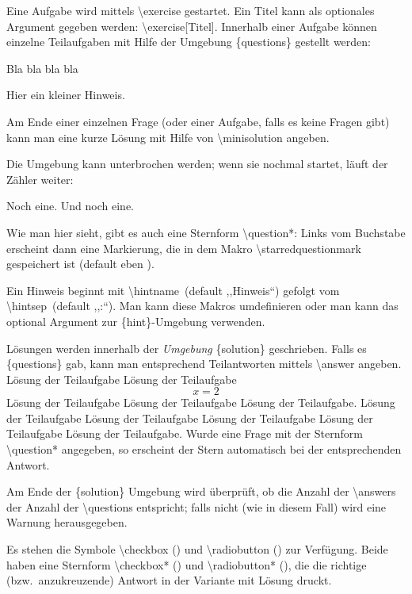 \documentclass[hyperworksheet]{drcschool}
\newcommand*{\cs}[1]{\textup{\ttfamily\textbackslash#1}}                   %
\newcommand*{\opt}[1]{\textup{\ttfamily#1}}                                %
\newcommand*{\env}[1]{\textup{\ttfamily\{#1\}}}                            %
\begin{document}
\begin{worksheet}
\exercise[Titel]\label{ex:foo}
Eine Aufgabe wird mittels \cs{exercise} gestartet.
Ein Titel kann als optionales Argument gegeben werden: \cs{exercise[Titel]}.
Innerhalb einer Aufgabe können einzelne Teilaufgaben mit Hilfe der Umgebung
\env{questions} gestellt werden:
\begin{questions}
\question Bla bla bla bla
\begin{hint}
Hier ein kleiner Hinweis.
\end{hint}
\question Am Ende einer einzelnen Frage (oder einer Aufgabe, falls es keine Fragen gibt)
   kann man eine kurze Lösung mit Hilfe von \cs{minisolution} angeben.
\end{questions}
Die Umgebung kann unterbrochen werden; wenn sie nochmal startet, läuft der Zähler
weiter:
\begin{questions}
\question* Noch eine.
\question Und noch eine.
\end{questions}
Wie man hier sieht, gibt es auch eine Sternform \cs{question*}:
Links vom Buchstabe erscheint dann eine Markierung, die in dem Makro
\cs{starredquestionmark} gespeichert ist (default eben \opt{*}).
\begin{hint}[Aufpassen!]
Ein Hinweis beginnt mit \cs{hintname}~(default ,,Hinweis``) gefolgt vom \cs{hintsep}~(default ,,:``).
Man kann diese Makros umdefinieren oder man kann das optional Argument zur \env{hint}-Umgebung
verwenden.
\end{hint}

\begin{solution}
Lösungen werden innerhalb der \emph{Umgebung} \env{solution} geschrieben.
Falls es \env{questions} gab, kann man entsprechend Teilantworten mittels \cs{answer}
angeben.
\answer Lösung der Teilaufgabe Lösung der Teilaufgabe
\[
x=2
\]
Lösung der Teilaufgabe Lösung der Teilaufgabe Lösung der Teilaufgabe.
\answer Lösung der Teilaufgabe Lösung der Teilaufgabe Lösung der Teilaufgabe Lösung der Teilaufgabe Lösung der Teilaufgabe.
\answer Wurde eine Frage mit der Sternform \cs{question*} angegeben, so erscheint der
Stern automatisch bei der entsprechenden Antwort.

Am Ende der \env{solution} Umgebung wird überprüft, ob die Anzahl der \cs{answer}s
der Anzahl der \cs{question}s entspricht; falls nicht (wie in diesem Fall) wird eine Warnung herausgegeben.
\end{solution}

Es stehen die Symbole \cs{checkbox} (\checkbox) und \cs{radiobutton} (\radiobutton)
zur Verfügung. Beide haben eine Sternform \cs{checkbox*} (\checkbox*) und
\cs{radiobutton*} (\radiobutton*), die die richtige (bzw.~anzukreuzende) Antwort
in der Variante mit Lösung druckt.


\end{worksheet}
\end{document}
